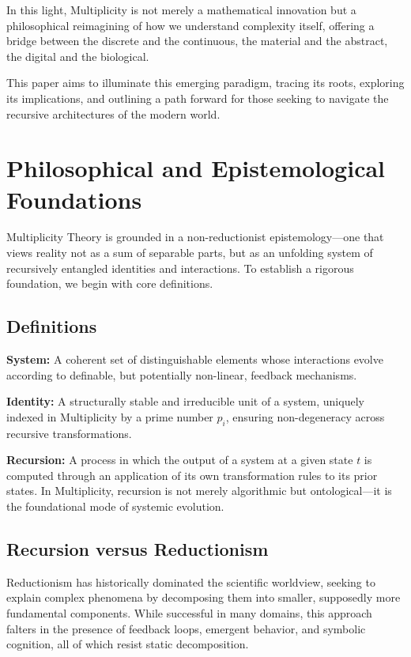\documentclass{article}
\theoremstyle{plain}
\begin{document}
In this light, Multiplicity is not merely a mathematical innovation but a philosophical reimagining of how we understand complexity itself, offering a bridge between the discrete and the continuous, the material and the abstract, the digital and the biological.

This paper aims to illuminate this emerging paradigm, tracing its roots, exploring its implications, and outlining a path forward for those seeking to navigate the recursive architectures of the modern world.

\section{Philosophical and Epistemological Foundations}

Multiplicity Theory is grounded in a non-reductionist epistemology—one that views reality not as a sum of separable parts, but as an unfolding system of recursively entangled identities and interactions. To establish a rigorous foundation, we begin with core definitions.

\subsection{Definitions}

\textbf{System:} A coherent set of distinguishable elements whose interactions evolve according to definable, but potentially non-linear, feedback mechanisms.

\textbf{Identity:} A structurally stable and irreducible unit of a system, uniquely indexed in Multiplicity by a prime number \( p_i \), ensuring non-degeneracy across recursive transformations.

\textbf{Recursion:} A process in which the output of a system at a given state \( t \) is computed through an application of its own transformation rules to its prior states. In Multiplicity, recursion is not merely algorithmic but ontological—it is the foundational mode of systemic evolution.

\subsection{Recursion versus Reductionism}

Reductionism has historically dominated the scientific worldview, seeking to explain complex phenomena by decomposing them into smaller, supposedly more fundamental components. While successful in many domains, this approach falters in the presence of feedback loops, emergent behavior, and symbolic cognition, all of which resist static decomposition.
\end{document}
